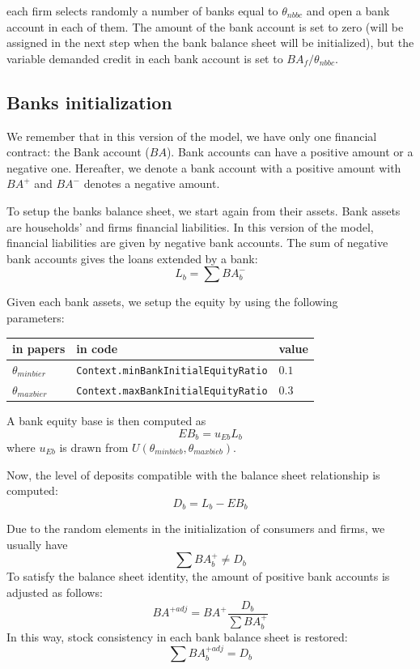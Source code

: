 \documentclass{book}
\begin{document}
\vskip5mm
each firm selects randomly a number of banks equal to $\theta_{nbbc}$ and open a bank account in each of them. The amount of the bank account is set to zero (will be assigned in the next step when the bank balance sheet will be initialized), but the variable demanded credit in each bank account is set to $BA_f/\theta_{nbbc}$.


\subsection{Banks initialization}
We remember that in this version of the model, we have only one financial contract: the Bank account ($BA$). Bank accounts can have a positive amount or a negative one. Hereafter, we denote a bank account with a positive amount with $BA^+$ and  $BA^-$ denotes a negative amount.

To setup the banks balance sheet, we start again from their assets. Bank assets are households' and firms financial liabilities. In this version of the model, financial liabilities are given by negative bank accounts. 
The sum of negative bank accounts gives the loans extended by a bank:
\[
L_b=\sum BA_b^-
\]



Given each bank assets, we setup the equity by using the following\\
parameters:\\
\begin{tabular}{l l l}
	\hline
	in papers& in code&value\\
	\hline
	\hline
 $\theta_{minbier}$&\verb+Context.minBankInitialEquityRatio+&$0.1$\\
 $\theta_{maxbier}$&\verb+Context.maxBankInitialEquityRatio+&$0.3$\\
	\hline
\end{tabular}

\vskip5mm
A bank equity base is then computed as
\[
	EB_b=u_{Eb}L_b
\]
where $u_{Eb}$ is drawn from $U(\theta_{minbieb},\theta_{maxbieb})$.

Now, the level of deposits compatible with the balance sheet relationship is computed:
\[
D_b=L_b-EB_b
\]

Due to the random elements in the initialization of consumers and firms, we usually have
\[
	\sum BA^+_b \neq D_b
\]
To satisfy the balance sheet identity, the amount of positive bank accounts is adjusted as follows:
\[
	BA^{+adj}=BA^+\frac{D_b}{\sum BA^+_b}
\]
In this way, stock consistency in each bank balance sheet is restored:
\[
	\sum BA^{+adj}_b=D_b
\]
\end{document}
